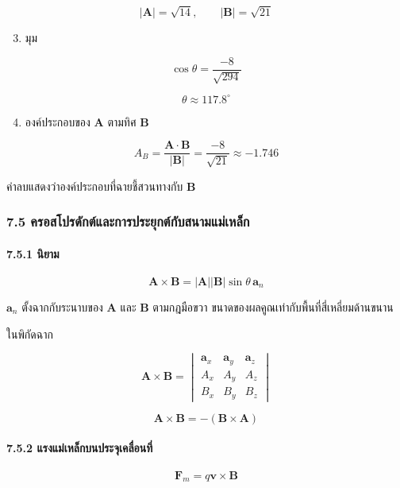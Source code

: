 \[
|\mathbf{A}|=\sqrt{14},\qquad |\mathbf{B}|=\sqrt{21}
\]

\begin{enumerate}
\setcounter{enumi}{2}
\item มุม
\end{enumerate}

\[
\cos\theta=\frac{-8}{\sqrt{294}}
\]

\[
\boxed{\theta\approx117.8^\circ}
\]

\begin{enumerate}
\setcounter{enumi}{3}
\item องค์ประกอบของ \(\mathbf{A}\) ตามทิศ \(\mathbf{B}\)
\end{enumerate}

\[
A_B=\frac{\mathbf{A}\cdot\mathbf{B}}{|\mathbf{B}|}
=\frac{-8}{\sqrt{21}}\approx-1.746
\]

ค่าลบแสดงว่าองค์ประกอบที่ฉายชี้สวนทางกับ \(\mathbf{B}\)

\subsubsection{7.5 ครอสโปรดักต์และการประยุกต์กับสนามแม่เหล็ก}

\paragraph{7.5.1 นิยาม}

\[
\mathbf{A}\times\mathbf{B}
=|\mathbf{A}||\mathbf{B}|\sin\theta\,\mathbf{a}_n
\]

\(\mathbf{a}_n\) ตั้งฉากกับระนาบของ \(\mathbf{A}\) และ \(\mathbf{B}\) ตามกฎมือขวา ขนาดของผลคูณเท่ากับพื้นที่สี่เหลี่ยมด้านขนาน

ในพิกัดฉาก

\[
\mathbf{A}\times\mathbf{B}
=
\begin{vmatrix}
\mathbf{a}_x & \mathbf{a}_y & \mathbf{a}_z\\
A_x & A_y & A_z\\
B_x & B_y & B_z
\end{vmatrix}
\]

\[
\mathbf{A}\times\mathbf{B}=-(\mathbf{B}\times\mathbf{A})
\]

\paragraph{7.5.2 แรงแม่เหล็กบนประจุเคลื่อนที่}

\[
\mathbf{F}_m=q\mathbf{v}\times\mathbf{B}
\]

